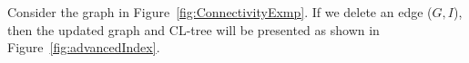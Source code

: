 \iffalse
\begin{example}
\label{ep:delete}
Consider the graph in Figure~\ref{fig:ConnectivityExmp}. If we delete an edge ($G,I$), then the updated graph and CL-tree will be presented as shown in Figure~\ref{fig:advancedIndex}. 
\end{example}
\begin{figure}[ht]
    \centering
    \mbox{
        }
\end{figure}
